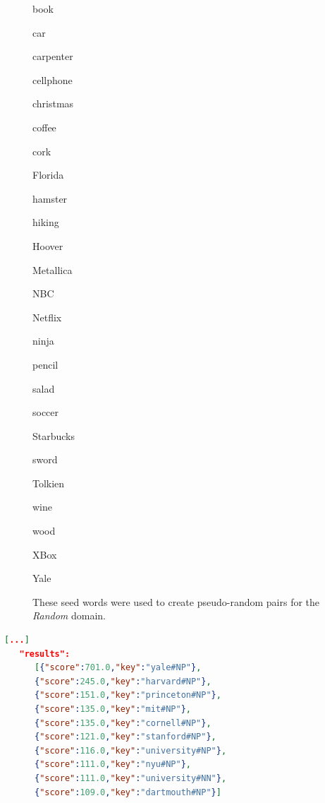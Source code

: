 \begin{figure}[bth]
\centering
\caption{These seed words were used to create pseudo-random pairs for the \emph{Random} domain. }
\label{fig:seed}
\begin{multicols}{5}
book%

car%

carpenter%

cellphone%

christmas%

coffee%

cork%

Florida%

hamster%

hiking

Hoover%

Metallica%

NBC%

Netflix%

ninja%

pencil%

salad%

soccer%

Starbucks%

sword%

Tolkien%

wine%

wood%

XBox%

Yale%
\end{multicols}

\end{figure}

\begin{minipage}{\linewidth}
\begin{lstlisting}[language=json,label=lst:jbtres,caption=The JoBimText response for \emph{\enquote{Yale}}. These objects can be compared in a meaningful way.]
[...]
   "results":
      [{"score":701.0,"key":"yale#NP"},
      {"score":245.0,"key":"harvard#NP"},
      {"score":151.0,"key":"princeton#NP"},
      {"score":135.0,"key":"mit#NP"},
      {"score":135.0,"key":"cornell#NP"},
      {"score":121.0,"key":"stanford#NP"},
      {"score":116.0,"key":"university#NP"},
      {"score":111.0,"key":"nyu#NP"},
      {"score":111.0,"key":"university#NN"},
      {"score":109.0,"key":"dartmouth#NP"}]
\end{lstlisting}
\end{minipage}

